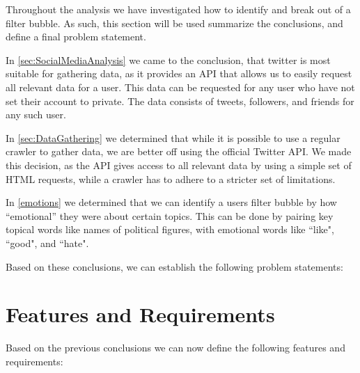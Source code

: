 
Throughout the analysis we have investigated how to identify and break out of a
filter bubble. As such, this section will be used summarize the
conclusions, and define a final problem statement.\nl

In \autoref{sec:SocialMediaAnalysis} we came to the conclusion, that twitter
is most suitable for gathering data, as it provides an API that allows us to easily
request all relevant data for a user. This data can be requested for any user
who have not set their account to private. The data consists of tweets,
followers, and friends for any such user.\nl

In \autoref{sec:DataGathering} we determined that while it is possible to use
a regular crawler to gather data, we are better off using the official
Twitter API. We made this decision, as the API gives access to all relevant
data by using a simple set of HTML requests, while a crawler has to adhere to a
stricter set of limitations.\nl

In \autoref{emotions} we determined that we can identify a users filter
bubble by how ``emotional'' they were about certain topics. This can be done
by pairing key topical words like names of political figures, with emotional
words like ``like", ``good", and ``hate".\nl

Based on these conclusions, we can establish the following problem statements:

\begin{center}
\begin{minipage}{0.95\linewidth} 


\end{minipage}
\end{center}

\section{Features and Requirements}
Based on the previous conclusions we can now define the following features and
requirements:



